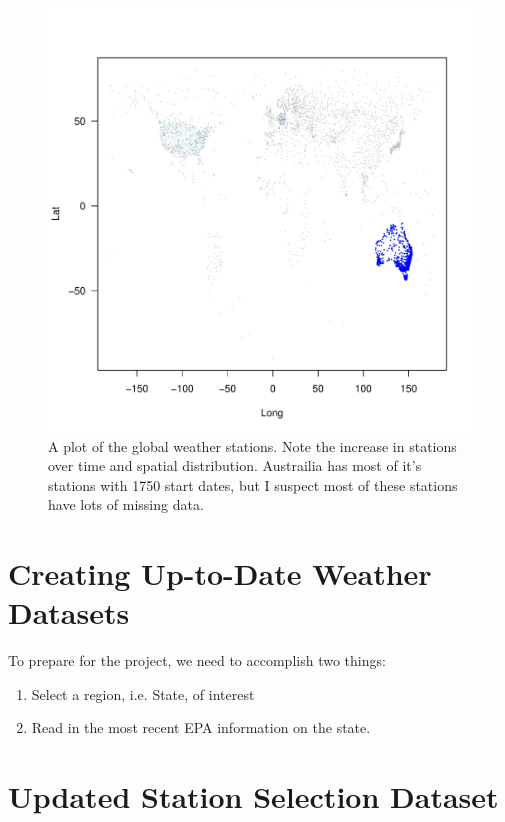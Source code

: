 \documentclass{article}\usepackage[]{graphicx}\usepackage[]{xcolor}
\makeatletter
\def\maxwidth{ %
  \ifdim\Gin@nat@width>\linewidth
    \linewidth
  \else
    \Gin@nat@width
  \fi
}
\newenvironment{knitrout}{}{} %
\makeatother
\begin{document}
\begin{figure}
  \caption{A plot of the global weather stations. Note the increase in stations over time and spatial distribution. Austrailia has most of it's stations with 1750 start dates, but I suspect most of these stations have lots of missing data. }
  \label{fig:global-weather-stations}
\begin{knitrout}
\color{fgcolor}
\includegraphics[width=\maxwidth]{figure/unnamed-chunk-4-1} 
\end{knitrout}
\end{figure}

\section{Creating Up-to-Date Weather Datasets}

To prepare for the project, we need to accomplish two things: 

\begin{enumerate}
  \item Select a region, i.e. State, of interest
  \item Read in the most recent EPA information on the state.
\end{enumerate}

\section{Updated Station Selection Dataset}
\end{document}
